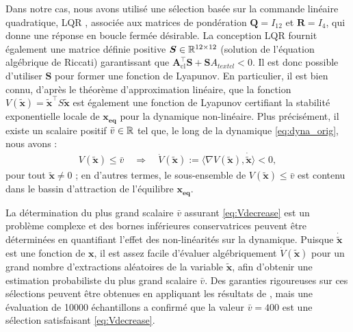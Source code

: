 Dans notre cas, nous avons utilisé une sélection basée sur la commande linéaire quadratique, LQR , associée aux matrices de pondération $\boldsymbol{Q} = I_{12}$ et $\boldsymbol{R} = I_{4}$, qui donne une réponse en boucle fermée désirable. La conception LQR fournit également une matrice définie positive  $\boldsymbol{S} \in {\mathbb R}^{12 \times 12}$ (solution de l'équation algébrique de Riccati) garantissant que $\boldsymbol{A}_{\text{cl}}^\top \boldsymbol{S} + \boldsymbol{S} A_{text{cl}} <0$. Il est donc possible d'utiliser $\boldsymbol{S}$ pour former une fonction de Lyapunov.  En particulier, il est bien connu, d'après le théorème d'approximation linéaire, que la fonction $V(\boldsymbol{\tilde x}) = \boldsymbol{\tilde x}^\top S \boldsymbol{\tilde x}$ est également une fonction de Lyapunov certifiant la stabilité exponentielle locale de $\boldsymbol{x_{\text{eq}}}$ pour la dynamique non-linéaire. Plus précisément, il existe un scalaire positif $\bar v \in {\mathbb R}$ tel que, le long de la dynamique \eqref{eq:dyna_orig}, nous avons :
\begin{align}
\label{eq:Vdecrease}
  V(\boldsymbol{\tilde x}) \leq \bar v \quad \Rightarrow \quad \dot V(\boldsymbol{\tilde x}) := \langle 
\nabla V(\boldsymbol{\tilde x}), \boldsymbol{\dot{\tilde x}}\rangle <0,
\end{align}
pour tout $\boldsymbol{\tilde x} \neq 0$ ; en d'autres termes, le sous-ensemble de $V(\boldsymbol{\tilde x}) \leq \bar v$ est contenu dans le bassin d'attraction de l'équilibre $\boldsymbol{x_{\text{eq}}}$.

La détermination du plus grand scalaire $\bar v$ assurant \eqref{eq:Vdecrease} est un problème complexe et des bornes inférieures conservatrices peuvent être déterminées en quantifiant l'effet des non-linéarités sur la dynamique. Puisque $\boldsymbol{\dot{\tilde x}}$ est une fonction de $\boldsymbol{x}$, il est assez facile d'évaluer algébriquement $\dot V(\boldsymbol{\tilde x})$ pour un grand nombre d'extractions aléatoires de la variable $\boldsymbol{\tilde x}$, afin d'obtenir une estimation probabiliste du plus grand scalaire $\bar v$. Des garanties rigoureuses sur ces sélections peuvent être obtenues en appliquant les résultats de \cite{tempo2013randomized}, mais une évaluation de 10000 échantillons a confirmé que la valeur $\bar v = 400$ est une sélection satisfaisant \eqref{eq:Vdecrease}.


